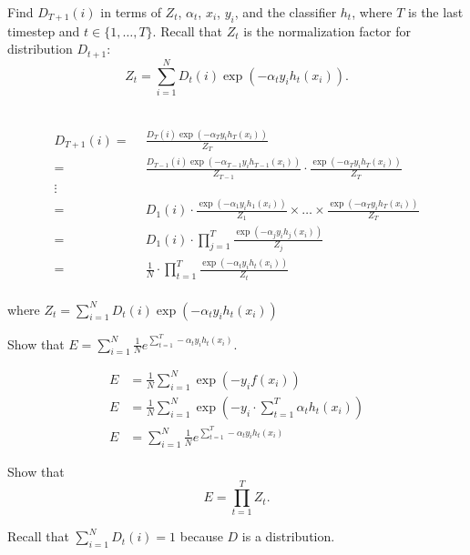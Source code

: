 \problem[3]
Find $D_{T + 1}(i)$ in terms of $Z_t$, $\alpha_t$, $x_i$, $y_i$, and the classifier $h_t$, where $T$ is the last timestep and $t \in \{1, \ldots, T\}$. Recall that $Z_t$ is the normalization factor for distribution $D_{t+1}$:
$$Z_t = \sum\limits_{i=1}^N D_t(i) \exp(-\alpha_{t}y_{i}h_{t}(x_{i})).$$

\begin{solution}
    \\
    \begin{align*}
        D_{T + 1}(i) =& \ \ \frac{D_T(i) \exp(-\alpha_{T}y_{i}h_{T}(x_{i}))}{Z_{T}} \\ 
        =& \ \ \frac{D_{T-1}(i) \exp(-\alpha_{T-1}y_{i}h_{T-1}(x_{i}))}{Z_{T-1}} \cdot \frac{\exp(-\alpha_{T}y_{i}h_{T}(x_{i}))}{Z_T} \\
        \vdots \\
        =& \ \ D_{1}(i) \cdot \frac{\exp(-\alpha_{1}y_{i}h_{1}(x_i))}{Z_1} \times \dots \times \frac{\exp(-\alpha_{T}y_{i}h_{T}(x_{i}))}{Z_T} \\
        =& \ \ D_{1}(i) \cdot \prod_{j = 1}^{T} \frac{\exp(-\alpha_{j}y_{i}h_{j}(x_i))}{Z_{j}} \\
        =& \ \ \frac{1}{N} \cdot \prod_{t = 1}^{T} \frac{\exp(-\alpha_{t}y_{i}h_{t}(x_i))}{Z_{t}}
    \end{align*} \\
    where $Z_{t} = \sum\limits_{i=1}^N D_t(i) \exp(-\alpha_{t}y_{i}h_{t}(x_{i}))$ \\
\end{solution}

\problem[2]
Show that $E = \sum_{i=1}^N  \frac{1}{N} e^{\sum_{t=1}^T -\alpha_t y_i h_t(x_i)}.$

\begin{solution}
    \begin{align*}
        E &= \frac{1}{N} \sum\limits_{i=1}^N \exp(-y_{i}f(x_i)) \\
        E &= \frac{1}{N} \sum\limits_{i=1}^N \exp(-y_{i}\cdot\sum\limits_{t=1}^T \alpha_{t}h_{t}(x_i)) \\
        E &= \sum\limits_{i=1}^N \frac{1}{N} e^{\sum\limits_{t=1}^T -\alpha_{t}y_{i}h_{t}(x_i)}
    \end{align*}
\end{solution}

\problem[5]
Show that
$$E = \prod\limits_{t=1}^T Z_t.$$

\begin{hint}
	Recall that $\sum_{i = 1}^N D_t(i) = 1$ because $D$ is a distribution.
\end{hint}

